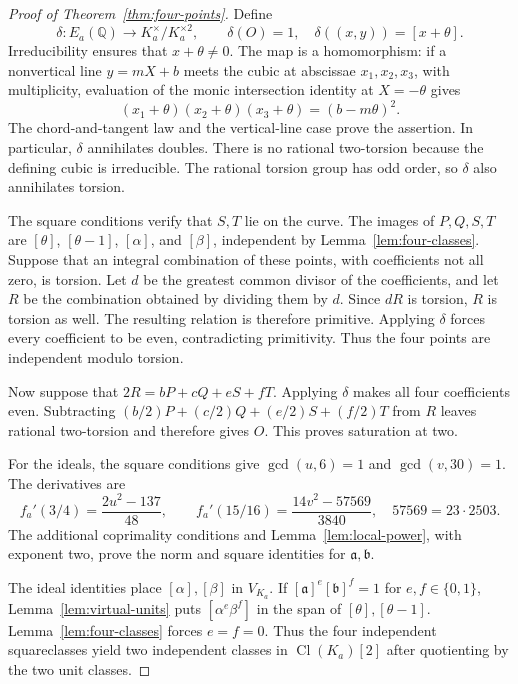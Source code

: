 \documentclass[11pt,leqno,oneside,letterpaper]{amsart}
\theoremstyle{remark}
\numberwithin{equation}{section}
\newcommand{\Q}{\mathbb Q}
\DeclareMathOperator{\Cl}{Cl}
\begin{document}
\begin{proof}[Proof of Theorem~\ref{thm:four-points}]
  Define
  \[
    \delta:E_a(\Q)\longrightarrow K_a^\times/K_a^{\times2},
    \qquad\delta(O)=1,\quad\delta((x,y))=[x+\theta].
  \]
  Irreducibility ensures that $x+\theta\ne0$. The map is a homomorphism: if a nonvertical line $y=mX+b$ meets the cubic at abscissae $x_1,x_2,x_3$, with multiplicity, evaluation of the monic intersection identity at $X=-\theta$ gives
  \[
    (x_1+\theta)(x_2+\theta)(x_3+\theta)=(b-m\theta)^2.
  \]
  The chord-and-tangent law and the vertical-line case prove the assertion. In particular, $\delta$ annihilates doubles. There is no rational two-torsion because the defining cubic is irreducible. The rational torsion group has odd order, so $\delta$ also annihilates torsion.

  The square conditions verify that $S,T$ lie on the curve. The images of $P,Q,S,T$ are $[\theta]$, $[\theta-1]$, $[\alpha]$, and $[\beta]$, independent by Lemma~\ref{lem:four-classes}. Suppose that an integral combination of these points, with coefficients not all zero, is torsion. Let $d$ be the greatest common divisor of the coefficients, and let $R$ be the combination obtained by dividing them by $d$. Since $dR$ is torsion, $R$ is torsion as well. The resulting relation is therefore primitive. Applying $\delta$ forces every coefficient to be even, contradicting primitivity. Thus the four points are independent modulo torsion.

  Now suppose that $2R=bP+cQ+eS+fT$. Applying $\delta$ makes all four coefficients even. Subtracting $(b/2)P+(c/2)Q+(e/2)S+(f/2)T$ from $R$ leaves rational two-torsion and therefore gives $O$. This proves saturation at two.

  For the ideals, the square conditions give $\gcd(u,6)=1$ and $\gcd(v,30)=1$. The derivatives are
  \[
    f_a'(3/4)=\frac{2u^2-137}{48},\qquad
    f_a'(15/16)=\frac{14v^2-57569}{3840},
    \quad 57569=23\cdot2503.
  \]
  The additional coprimality conditions and Lemma~\ref{lem:local-power}, with exponent two, prove the norm and square identities for $\mathfrak a,\mathfrak b$.

  The ideal identities place $[\alpha],[\beta]$ in $V_{K_a}$. If $[\mathfrak a]^e[\mathfrak b]^f=1$ for $e,f\in\{0,1\}$, Lemma~\ref{lem:virtual-units} puts $[\alpha^e\beta^f]$ in the span of $[\theta],[\theta-1]$. Lemma~\ref{lem:four-classes} forces $e=f=0$. Thus the four independent squareclasses yield two independent classes in $\Cl({K_a})[2]$ after quotienting by the two unit classes.
\end{proof}
\end{document}
